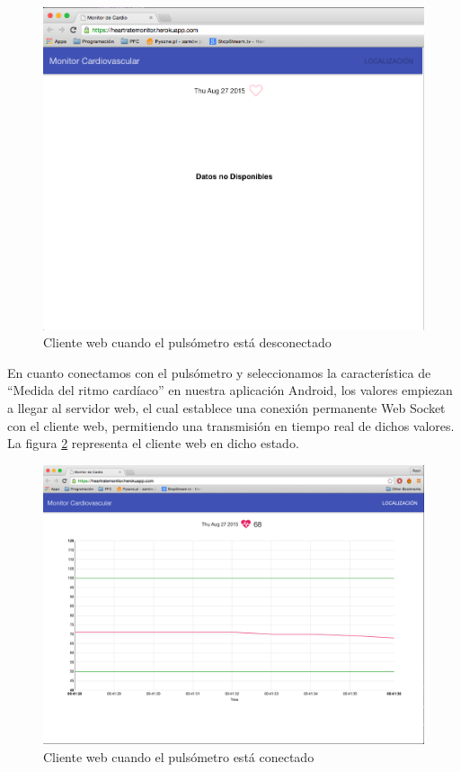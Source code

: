 \begin{figure}[h] \centering
	\includegraphics[width=15cm]{graphs/webDesconectado.png} \caption{Cliente web cuando el pulsómetro está desconectado}\label{fig:web:Desconectado}
\end{figure}

En cuanto conectamos con el pulsómetro y seleccionamos la característica de ``Medida del ritmo cardíaco'' en nuestra aplicación Android, los valores empiezan a llegar al servidor web, el cual establece una conexión permanente Web Socket con el cliente web, permitiendo una transmisión en tiempo real de dichos valores. La figura \ref{fig:web:Conectado} representa el cliente web en dicho estado.

\begin{figure}[h] \centering
	\includegraphics[width=15cm]{graphs/webConectado.png} \caption{Cliente web cuando el pulsómetro está conectado}\label{fig:web:Conectado}
\end{figure}

